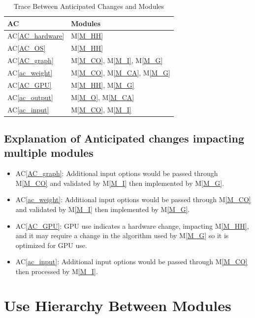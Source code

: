 \documentclass[12pt, titlepage]{article}
\newcommand{\acref}[1]{AC\ref{#1}}
\newcommand{\mref}[1]{M\ref{#1}}
\begin{document}
\begin{table}[H]
\centering
\begin{tabular}{p{} p{}}
\toprule
\textbf{AC} & \textbf{Modules}\\
\midrule
\acref{AC_hardware} & \mref{M_HH}\\
\acref{AC_OS} & \mref{M_HH}\\
\acref{AC_graph} & \mref{M_CO}, \mref{M_I}, \mref{M_G}\\
\acref{ac_weight} & \mref{M_CO}, \mref{M_CA}, \mref{M_G}\\
\acref{AC_GPU} & \mref{M_HH}, \mref{M_G}\\
\acref{ac_output} &  \mref{M_O}, \mref{M_CA} \\
\acref{ac_input} & \mref{M_CO}, \mref{M_I}\\
\bottomrule
\end{tabular}
\caption{Trace Between Anticipated Changes and Modules}
\label{TblACT}
\end{table}

\subsection{Explanation of Anticipated changes impacting \\ multiple modules}

\begin{itemize}
    \item \acref{AC_graph}: Additional input options would be passed through \mref{M_CO} and validated by \mref{M_I} then implemented by \mref{M_G}.
    \item \acref{ac_weight}: Additional input options would be passed through \mref{M_CO} and validated by \mref{M_I} then implemented by \mref{M_G}.
    \item \acref{AC_GPU}: GPU use indicates a hardware change, impacting \mref{M_HH}, and it may require a change in the algorithm used by \mref{M_G} so it is optimized for GPU use.
    \item \acref{ac_input}: Additional input options would be passed through \mref{M_CO} then processed by \mref{M_I}.
\end{itemize}


\newpage

\section{Use Hierarchy Between Modules} \label{SecUse}
\end{document}
